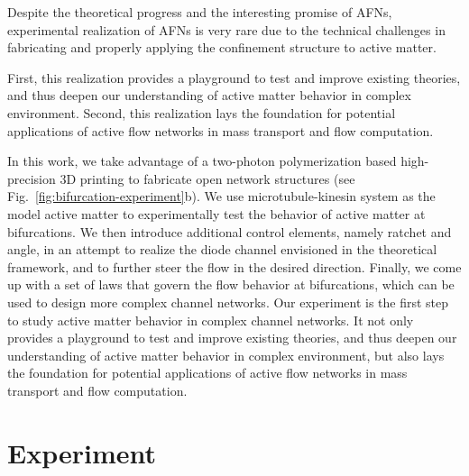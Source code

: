 \documentclass[%
10pt,
superscriptaddress,
twocolumn,
 amsmath,amssymb,
 aps,prx,
]{revtex4-2}
\begin{document}
Despite the theoretical progress and the interesting promise of AFNs, experimental realization of AFNs is very rare due to the technical challenges in fabricating and properly applying the confinement structure to active matter.

First, this realization provides a playground to test and improve existing theories, and thus deepen our understanding of active matter behavior in complex environment. 
Second, this realization lays the foundation for potential applications of active flow networks in mass transport and flow computation. 

In this work, we take advantage of a two-photon polymerization based high-precision 3D printing to fabricate open network structures (see Fig.~\ref{fig:bifurcation-experiment}b). 
We use microtubule-kinesin system as the model active matter to experimentally test the behavior of active matter at bifurcations.
We then introduce additional control elements, namely ratchet and angle, in an attempt to realize the diode channel envisioned in the theoretical framework, and to further steer the flow in the desired direction.
Finally, we come up with a set of laws that govern the flow behavior at bifurcations, which can be used to design more complex channel networks.
Our experiment is the first step to study active matter behavior in complex channel networks.
It not only provides a playground to test and improve existing theories, and thus deepen our understanding of active matter behavior in complex environment, but also lays the foundation for potential applications of active flow networks in mass transport and flow computation. 



\section{Experiment}
\end{document}

